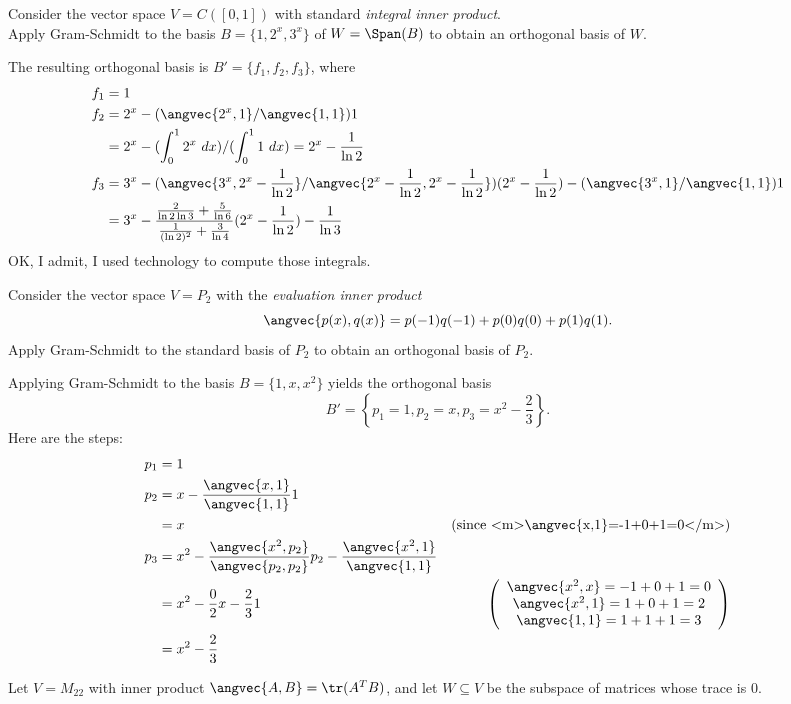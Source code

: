 \ii Consider the vector space $V=C([0,1])$ with standard {\em integral inner product}. 
\\
Apply Gram-Schmidt to the basis $B=\{1,2^x, 3^x\}$ of $W=\Span(B)$ to obtain an orthogonal basis of $W$. 
\\
\begin{solution}
\noindent The resulting orthogonal basis is $B'=\{f_1, f_2,f_3\}$, where 
\begin{align*}
f_1&=1 \\
f_2&=2^x-(\angvec{2^x,1}/\angvec{1,1})1\\
     &=2^x-(\int_{0}^12^x \ dx)/(\int_0^1 1 \ dx)=2^x-\frac{1}{\ln 2}\\
f_3&=3^x-(\angvec{3^x,2^x-\frac{1}{\ln 2}}/\angvec{2^x-\frac{1}{\ln 2}, 2^x-\frac{1}{\ln 2}})(2^x-\frac{1}{\ln 2})-(\angvec{3^x,1}/\angvec{1,1})1\\
&=3^x-\frac{\frac{2}{\ln 2\ln 3}+\frac{5}{\ln 6}}{\frac{1}{(\ln 2)^2}+\frac{3}{\ln 4}}(2^x-\frac{1}{\ln 2})-\frac{1}{\ln 3}
\end{align*}
OK, I admit, I used technology to compute those integrals. 
\end{solution}
\ii Consider the vector space $V=P_2$ with the {\em evaluation inner product} 
\[
\angvec{p(x),q(x)}=p(-1)q(-1)+p(0)q(0)+p(1)q(1).
\] 
Apply Gram-Schmidt to the standard basis of $P_2$ to obtain an orthogonal basis of $P_2$. 
\\
\begin{solution}
\noindent Applying Gram-Schmidt to the basis $B=\{1,x,x^2\}$ yields the orthogonal basis 
\[
B'=\left\{p_1=1, p_2=x, p_3=x^2-\frac{2}{3}\right\}.
\]
Here are the steps: 
\begin{align*}
p_1&=1 \\
p_2&=x-\frac{\angvec{x,1}}{\angvec{1,1}}1\\
&=x &\text{(since <m>\angvec{x,1}=-1+0+1=0</m>)}\\
p_3&=x^2-\frac{\angvec{x^2,p_2}}{\angvec{p_2,p_2}}p_2-\frac{\angvec{x^2,1}}{\angvec{1,1}}\\
&=x^2-\frac{0}{2}x-\frac{2}{3}1&\left(\begin{array}{c} \angvec{x^2,x}=-1+0+1=0\\ \angvec{x^2,1}=1+0+1=2\\ \angvec{1,1}=1+1+1=3\end{array}\right)\\
&=x^2-\frac{2}{3}
\end{align*}
\end{solution}
\ii Let $V=M_{22}$ with inner product $\angvec{A,B}=\tr(A^TB)$, and let $W\subseteq V$ be the subspace of matrices whose trace is 0. 

